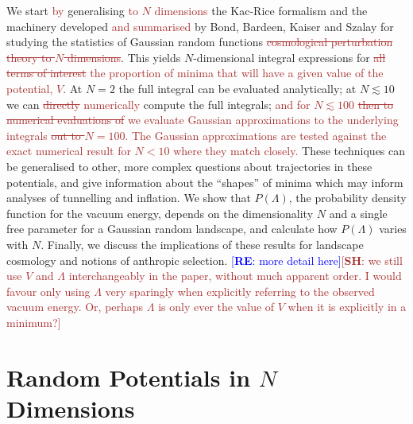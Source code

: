 \documentclass[12pt]{article}
\newcommand{\re}[1]{\textcolor{blue}{[{\bf RE}: #1]}}
\newcommand{\SH}[1]{\textcolor{brown}{[{\bf SH}: #1]}}
\newcommand{\sh}[1]{\textcolor{brown}{#1}}
\begin{document}
We start \sh{by} generalising \sh{to $N$ dimensions} the Kac-Rice formalism \cite{Kac1943,Rice1945} and the  machinery developed \sh{and summarised} by Bond, Bardeen, Kaiser and Szalay  \cite{BBKS}  for studying the statistics of Gaussian random functions \sh{\sout{ cosmological perturbation theory to $N$ dimensions}}. This yields $N$-dimensional integral expressions for \sh{\sout{all terms of interest} the proportion of minima that will have a given value of the potential, $V$}. At $N=2$ the full integral can be evaluated analytically; at $N \lesssim 10$ we can \sh{\sout{directly} numerically} compute the full integrals; \sh{and for $N \lesssim 100$ \sout{then to numerical evaluations of} we evaluate Gaussian approximations to the underlying integrals \sout{out to $N=100$}. The Gaussian approximations are tested against the exact numerical result for $N <10$ where they match closely.} These techniques can be generalised to other, more complex questions about trajectories in these potentials, and give information about the ``shapes'' of minima which may inform analyses of tunnelling and inflation. We show that $P(\Lambda)$, the probability density function for the vacuum energy, depends on the dimensionality $N$ and a single free parameter for a Gaussian random landscape, and calculate how $P(\Lambda)$ varies with $N$. Finally, we discuss the implications of these results for landscape cosmology and notions of anthropic selection. \re{more detail here}\SH{we still use $V$ and $\Lambda$ interchangeably in the paper, without much apparent order. I would favour only using $\Lambda$ very sparingly when explicitly referring to the observed vacuum energy. Or, perhaps $\Lambda$ is only ever the value of $V$ when it is explicitly in a minimum?}

\section{Random Potentials in $N$ Dimensions}

\end{document}
